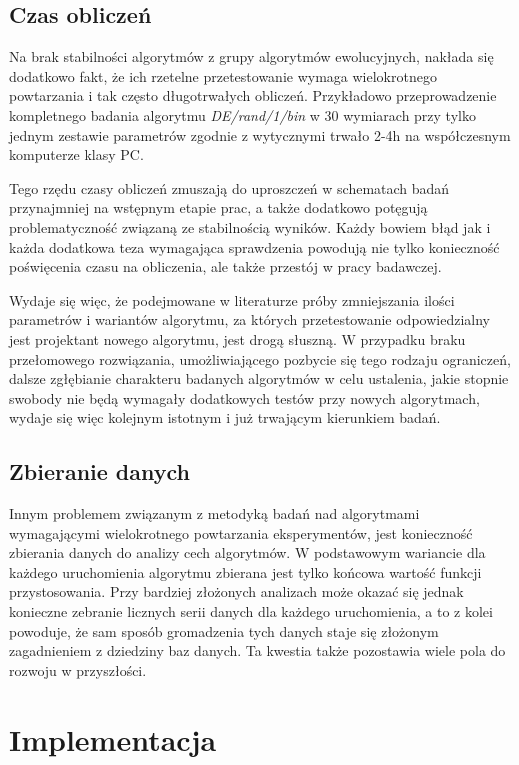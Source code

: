 \documentclass[12pt,a4paper]{report}
\begin{document}
{{{{{{\subsection{Czas obliczeń}
\par{
Na brak stabilności algorytmów z grupy algorytmów ewolucyjnych, nakłada się dodatkowo fakt, że ich rzetelne przetestowanie wymaga wielokrotnego powtarzania i tak często długotrwałych obliczeń. Przykładowo przeprowadzenie kompletnego badania algorytmu \emph{DE/rand/1/bin} w 30 wymiarach przy tylko jednym zestawie parametrów zgodnie z wytycznymi \cite{CEC2013DEbasic} trwało 2-4h na współczesnym komputerze klasy PC.
}
\par{
Tego rzędu czasy obliczeń zmuszają do uproszczeń w schematach badań przynajmniej na wstępnym etapie prac, a także dodatkowo potęgują problematyczność związaną ze stabilnością wyników. Każdy bowiem błąd jak i każda dodatkowa teza wymagająca sprawdzenia powodują nie tylko konieczność poświęcenia czasu na obliczenia, ale także przestój w pracy badawczej.
}
\par{
Wydaje się więc, że podejmowane w literaturze próby zmniejszania ilości parametrów i wariantów algorytmu, za których przetestowanie odpowiedzialny jest projektant nowego algorytmu, jest drogą słuszną. W przypadku braku przełomowego rozwiązania, umożliwiającego pozbycie się tego rodzaju ograniczeń, dalsze zgłębianie charakteru badanych algorytmów w celu ustalenia, jakie stopnie swobody nie będą wymagały dodatkowych testów przy nowych algorytmach, wydaje się więc kolejnym istotnym i już trwającym kierunkiem badań.
}
\subsection{Zbieranie danych}
\par{
Innym problemem związanym z metodyką badań nad algorytmami wymagającymi wielokrotnego powtarzania eksperymentów, jest konieczność zbierania danych do analizy cech algorytmów. W podstawowym wariancie dla każdego uruchomienia algorytmu zbierana jest tylko końcowa wartość funkcji przystosowania. Przy bardziej złożonych analizach może okazać się jednak konieczne zebranie licznych serii danych dla każdego uruchomienia, a to z kolei powoduje, że sam sposób gromadzenia tych danych staje się złożonym zagadnieniem z dziedziny baz danych. Ta kwestia także pozostawia wiele pola do rozwoju w przyszłości.
}
\section{Implementacja}
}}}}}}
\end{document}
